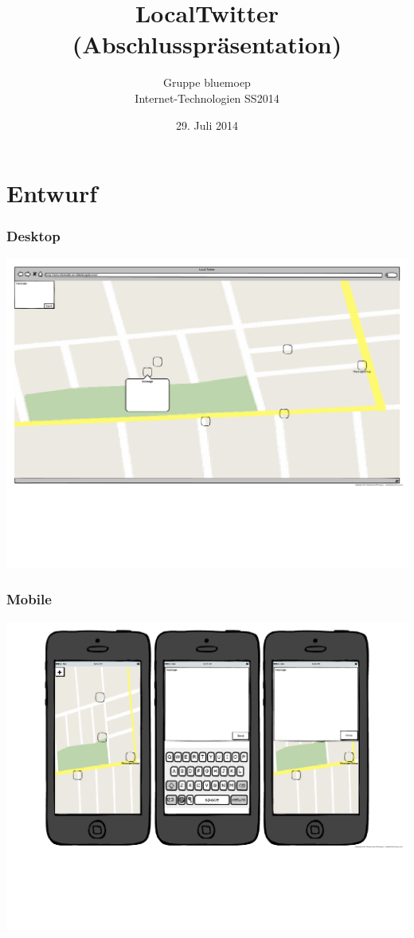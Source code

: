\documentclass[aspectratio=43]{beamer}
\title{LocalTwitter\\(Abschlusspräsentation)}
\author{Gruppe bluemoep\\Internet-Technologien SS2014}
\date{29. Juli 2014}
\begin{document}
\frame{\maketitle}

\section{Entwurf}
\begin{frame}
	\frametitle{Desktop}
	\includegraphics[width=\textwidth]{ITDesktopMockUp.pdf}
\end{frame}

\begin{frame}
	\frametitle{Mobile}
	\includegraphics[width=\textwidth]{ITMobileMockUp.pdf}
\end{frame}
\end{document}
